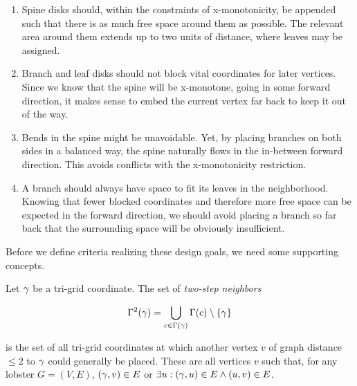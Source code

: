 \begin{enumerate}
    \item\label{dg_bend} Spine disks should, within the constraints of x-monotonicity, be appended such that there is as much free space around them as possible. The relevant area around them extends up to two units of distance, where leaves may be assigned.
    \item\label{dg_back} Branch and leaf disks should not block vital coordinates for later vertices. Since we know that the spine will be x-monotone, going in some forward direction, it makes sense to embed the current vertex far back to keep it out of the way.
    \item\label{dg_balance} Bends in the spine might be unavoidable. Yet, by placing branches on both sides in a balanced way, the spine naturally flows in the in-between forward direction. This avoids conflicts with the x-monotonicity restriction.
    \item\label{dg_space} A branch should always have space to fit its leaves in the neighborhood. Knowing that fewer blocked coordinates and therefore more free space can be expected in the forward direction, we should avoid placing a branch so far back that the surrounding space will be obviously insufficient.
\end{enumerate}

Before we define criteria realizing these design goals, we need some supporting concepts.

Let $\gamma$ be a tri-grid coordinate. The set of \emph{two-step neighbors}

\begin{equation*}
\Gamma^2(\gamma) = \bigcup\limits_{c \in \Gamma(\gamma)} \Gamma(c) \setminus \{ \gamma \}
\end{equation*}

is the set of all tri-grid coordinates at which another vertex $v$ of graph distance $\leq 2$ to $\gamma$ could generally be placed. These are all vertices $v$ such that, for any lobster $G = (V, E)$, $(\gamma, v) \in E$ or $\exists u: (\gamma, u) \in E \wedge (u, v) \in E$.

